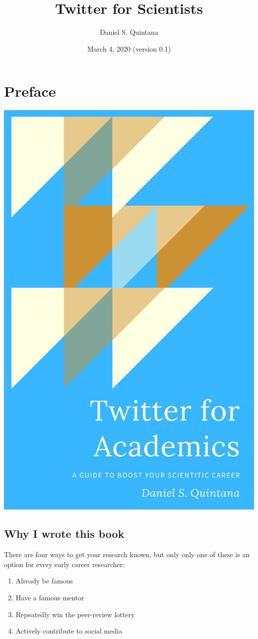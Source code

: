 \documentclass[]{book}
\title{Twitter for Scientists}
\author{Daniel S. Quintana}
\date{March 4, 2020 (version 0.1)}
\providecommand{\tightlist}{%
  \setlength{\itemsep}{0pt}\setlength{\parskip}{0pt}}
\begin{document}
\maketitle

{
\setcounter{tocdepth}{1}
\tableofcontents
}
\hypertarget{preface}{%
\chapter*{Preface}\label{preface}}

\begin{center}\includegraphics[width=0.5\linewidth]{images/cover} \end{center}

\hypertarget{why-i-wrote-this-book}{%
\section*{Why I wrote this book}\label{why-i-wrote-this-book}}

There are four ways to get your research known, but only only one of these is an option for every early career researcher:

\begin{enumerate}
\def\labelenumi{\arabic{enumi}.}
\tightlist
\item
  Already be famous
\item
  Have a famous mentor
\item
  Repeatedly win the peer-review lottery
\item
  Actively contribute to social media
\end{enumerate}
\end{document}
